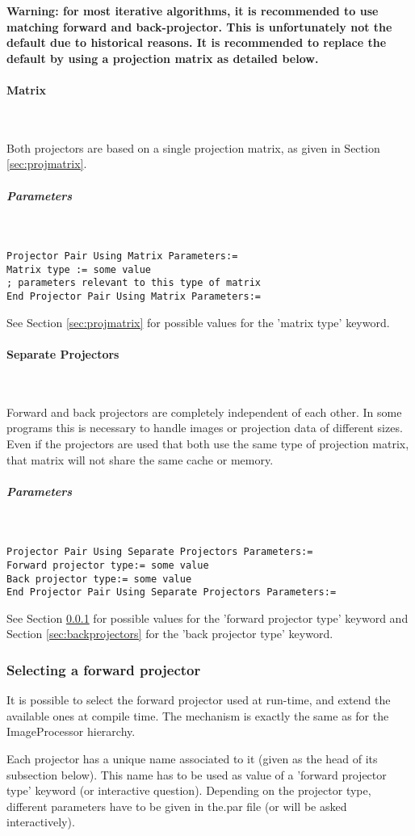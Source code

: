 \documentclass{article}
\newcommand{\subsubsubsection}[1]{\paragraph{#1}\mbox{} \\}
\newcommand{\subsubsubsubsection}[1]{\subparagraph{#1} \mbox{} \\}
\begin{document}
{\textbf{Warning: for most iterative algorithms, it is recommended 
to use matching forward and back-projector. This is unfortunately 
not the default due to historical reasons. It is recommended to replace
the default by using a projection matrix as detailed below.}

{ \subsubsubsection{Matrix}
}
\label{sec:projectorpairusingmatrix}
Both projectors are based on a single projection matrix, as given 
in Section \ref{sec:projmatrix}.

{ \subsubsubsubsection{Parameters}
}
\begin{verbatim}
Projector Pair Using Matrix Parameters:=
Matrix type := some value
; parameters relevant to this type of matrix
End Projector Pair Using Matrix Parameters:=
\end{verbatim}

See Section \ref{sec:projmatrix} for possible values for the 'matrix type' keyword.

{ \subsubsubsection{Separate Projectors }
}
Forward and back projectors are completely independent of each 
other. In some programs this is necessary to handle images or 
projection data of different sizes. \\
Even if the projectors are used that both use the same type of 
projection matrix, that matrix will not share the same cache 
or memory.

{ \subsubsubsubsection{Parameters}
}
\begin{verbatim}
Projector Pair Using Separate Projectors Parameters:=
Forward projector type:= some value
Back projector type:= some value
End Projector Pair Using Separate Projectors Parameters:=
\end{verbatim}

See Section \ref{sec:forwardprojectors} for possible values for the 'forward projector 
type' keyword and Section \ref{sec:backprojectors} for the 'back projector type' 
keyword.


\subsubsection{
Selecting a forward projector}
\label{sec:forwardprojectors}
It is possible to select the forward projector used at run-time, 
and extend the available ones at compile time. The mechanism 
is exactly the same as for the ImageProcessor hierarchy.


Each projector has a unique name associated to it (given as the 
head of its subsection below). This name has to be used as value 
of a 'forward projector type' keyword (or interactive question). 
Depending on the projector type, different parameters have to 
be given in the.par file (or will be asked interactively).

}
\end{document}
